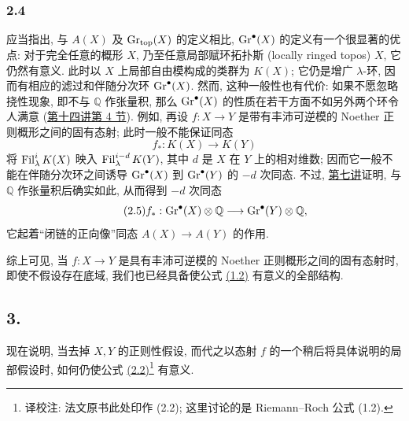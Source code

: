 \subsubsection*{2.4}
应当指出, 与 $A(X)$ 及 $\operatorname{Gr}_{\mathrm{top}}(X)$ 的定义相比, $\operatorname{Gr}^\bullet(X)$ 的定义有一个很显著的优点: 对于完全任意的概形 $X$, 乃至任意局部赋环拓扑斯 (locally ringed topos) $X$, 它仍然有意义. 此时以 $X$ 上局部自由模构成的类群为 $K(X)$; 它仍是增广 $\lambda$-环, 因而有相应的滤过和伴随分次环 $\operatorname{Gr}^\bullet(X)$. 然而, 这种一般性也有代价: 如果不愿忽略挠性现象, 即不与 $\mathbb Q$ 作张量积, 那么 $\operatorname{Gr}^\bullet(X)$ 的性质在若干方面不如另外两个环令人满意 (\hyperlink{sga6.e14.sec.4}{第十四讲第 4 节}). 例如, 再设 $f:X\to Y$ 是带有丰沛可逆模的 Noether 正则概形之间的固有态射; 此时一般不能保证同态
\[
f_*:K(X)\longrightarrow K(Y)
\]
将 $\operatorname{Fil}^i_\lambda K(X)$ 映入 $\operatorname{Fil}^{i-d}_\lambda K(Y)$, 其中 $d$ 是 $X$ 在 $Y$ 上的相对维数; 因而它一般不能在伴随分次环之间诱导 $\operatorname{Gr}^\bullet(X)$ 到 $\operatorname{Gr}^\bullet(Y)$ 的 $-d$ 次同态. 不过, \hyperlink{sga6.e07.expose}{第七讲}证明, 与 $\mathbb Q$ 作张量积后确实如此, 从而得到 $-d$ 次同态
\begin{equation}\tag{2.5}
f_*:\operatorname{Gr}^\bullet(X)\otimes\mathbb Q\longrightarrow \operatorname{Gr}^\bullet(Y)\otimes\mathbb Q,
\end{equation}
它起着“闭链的正向像”同态 $A(X)\to A(Y)$ 的作用.

综上可见, 当 $f:X\to Y$ 是具有丰沛可逆模的 Noether 正则概形之间的固有态射时, 即使不假设存在底域, 我们也已经具备使公式 \hyperlink{sga6.e00.eq.1-2}{(1.2)} 有意义的全部结构.

\subsection*{3.}
现在说明, 当去掉 $X,Y$ 的正则性假设, 而代之以态射 $f$ 的一个稍后将具体说明的局部假设时, 如何仍使公式 \hyperlink{sga6.e00.eq.2-2.outline}{(2.2)}\footnote{译校注: 法文原书此处印作 (2.2); 这里讨论的是 Riemann--Roch 公式 (1.2).} 有意义.


